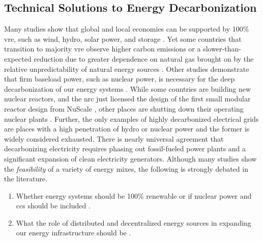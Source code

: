 \subsection{Technical Solutions to Energy Decarbonization}

Many studies show that global and local economies can be supported by 100\%
\ac{vre}, such as wind, hydro, solar power, and storage \cite{jacobson_100_2015,
bussar_optimal_2014,brown_response_2018,dorotic_integration_2019,wallsgrove_emerging_2021,
cochran_la100_2021,cosic_100_2012,traber_economically_2021,bogdanov_full_2021,
bogdanov_north-east_2016,
esteban_100_2018,yue_least_2020,neumann_near-optimal_2021}. Yet some countries
that transition to majority \ac{vre} observe higher carbon emissions or a
slower-than-expected reduction due to greater dependence on natural gas brought on
by the relative unpredictability of natural energy sources
\cite{wagner_co2_2021}. Other studies demonstrate that firm baseload power, such
as nuclear power, is necessary for the deep decarbonization of our energy
systems
\cite{wagner_co2_2021,shaner_geophysical_2018,dotson_influence_2022,greene_enhancing_2019,kim_carbon_2021,
lehtveer_how_2015,vaillancourt_role_2008,
de_sisternes_value_2016,alzbutas_uncertainty_2012,brook_why_2014,
epiney_economic_2020,petti_future_2018, patrizio_socially_2020}. While some
countries are building new nuclear reactors, and the \ac{nrc} just licensed the design
of the first small modular reactor design from NuScale
\cite{office_of_nuclear_energy_science_and_technology_nrc_2023}, other places
are shutting down their operating nuclear plants \cite{johnson_new_2021}. 
Further, the only examples of highly decarbonized electrical grids are places
with a high penetration of hydro or nuclear power and the former is widely
considered exhausted. There is nearly universal agreement that decarbonizing
electricity requires phasing out fossil-fueled power plants and a significant
expansion of clean electricity generators. Although many studies show the
\textit{feasibility} of a variety of energy mixes, the following is strongly
debated in the literature.
\begin{enumerate}
    \item Whether energy systems should be 100\% renewable or if nuclear power
    and \ac{ccs} should be included \cite{heard_burden_2017,
    brown_response_2018,elmallah_frontlining_2022, brook_why_2014}.
    \item What the role of distributed and decentralized energy sources in
    expanding our energy infrastructure should be
    \cite{pitt_assessing_2015,rinaldi_what_2022,parag_electricity_2016,wang_modeling_2020,
    morvaj_decarbonizing_2017,gilbert_can_2020,li_economic_2016,falke_multi-objective_2016}.
\end{enumerate}

